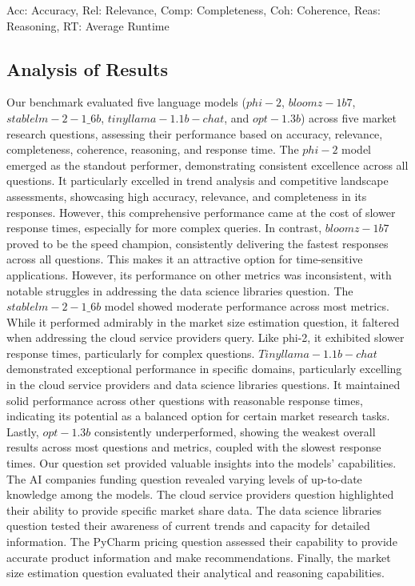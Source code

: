 \documentclass[12pt,a4paper]{article}
\begin{document}
	\begin{flushleft}
		\small
		Acc: Accuracy, Rel: Relevance, Comp: Completeness, Coh: Coherence, Reas: Reasoning, RT: Average Runtime
	\end{flushleft}
	\subsection{Analysis of Results}
	Our benchmark evaluated five language models ($phi-2$, $bloomz-1b7$, $stablelm-2-1\_6b$, $tinyllama-1.1b-chat$, and $opt-1.3b$) across five market research questions, assessing their performance based on accuracy, relevance, completeness, coherence, reasoning, and response time.
	The $phi-2$ model emerged as the standout performer, demonstrating consistent excellence across all questions. It particularly excelled in trend analysis and competitive landscape assessments, showcasing high accuracy, relevance, and completeness in its responses. However, this comprehensive performance came at the cost of slower response times, especially for more complex queries.
	In contrast, $bloomz-1b7$ proved to be the speed champion, consistently delivering the fastest responses across all questions. This makes it an attractive option for time-sensitive applications. However, its performance on other metrics was inconsistent, with notable struggles in addressing the data science libraries question.
	The $stablelm-2-1\_6b$ model showed moderate performance across most metrics. While it performed admirably in the market size estimation question, it faltered when addressing the cloud service providers query. Like phi-2, it exhibited slower response times, particularly for complex questions.
	$Tinyllama-1.1b-chat$ demonstrated exceptional performance in specific domains, particularly excelling in the cloud service providers and data science libraries questions. It maintained solid performance across other questions with reasonable response times, indicating its potential as a balanced option for certain market research tasks.
	Lastly, $opt-1.3b$ consistently underperformed, showing the weakest overall results across most questions and metrics, coupled with the slowest response times.
	Our question set provided valuable insights into the models' capabilities. The AI companies funding question revealed varying levels of up-to-date knowledge among the models. The cloud service providers question highlighted their ability to provide specific market share data. The data science libraries question tested their awareness of current trends and capacity for detailed information. The PyCharm pricing question assessed their capability to provide accurate product information and make recommendations. Finally, the market size estimation question evaluated their analytical and reasoning capabilities.
\end{document}
